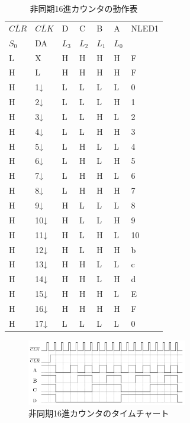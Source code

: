 \documentclass[twocolumn, 10pt,a4j]{jsarticle}
\begin{document}
  \begin{table}[H]
    \centering
    \caption{非同期16進カウンタの動作表}
    \label{my-label}
      \footnotesize
      \begin{tabular}{lllllll}
        $\overline{CLR}$ & $\overline{CLK}$ & D  & C  & B  & A  & NLED1 \\
        $S_{0}$  & DA  & $L_{3}$ & $L_{2}$ & $L_{1}$ & $L_{0}$ & \\ \hline
        L   & X   & H  & H  & H  & H  & F     \\
        H   & L   & H  & H  & H  & H  & F     \\
        H   & 1↓  & L  & L  & L  & L  & 0     \\
        H   & 2↓  & L  & L  & L  & H  & 1     \\
        H   & 3↓  & L  & L  & H  & L  & 2     \\
        H   & 4↓  & L  & L  & H  & H  & 3     \\
        H   & 5↓  & L  & H  & L  & L  & 4     \\
        H   & 6↓  & L  & H  & L  & H  & 5     \\
        H   & 7↓  & L  & H  & H  & L  & 6     \\
        H   & 8↓  & L  & H  & H  & H  & 7     \\
        H   & 9↓  & H  & L  & L  & L  & 8     \\
        H   & 10↓ & H  & L  & L  & H  & 9     \\
        H   & 11↓ & H  & L  & H  & L  & 10    \\
        H   & 12↓ & H  & L  & H  & H  & b     \\
        H   & 13↓ & H  & H  & L  & L  & c     \\
        H   & 14↓ & H  & H  & L  & H  & d     \\
        H   & 15↓ & H  & H  & H  & L  & E     \\
        H   & 16↓ & H  & H  & H  & H  & F     \\
        H   & 17↓ & L  & L  & L  & L  & 0    
      \end{tabular}
    \end{table}
  \begin{figure}[H]
    \begin{center}
      \includegraphics[width=7cm]{../img/junjokairo/hidouki_16shin_dousahyou.png}
      \caption{非同期16進カウンタのタイムチャート}
    \end{center}
  \end{figure}
\end{document}
